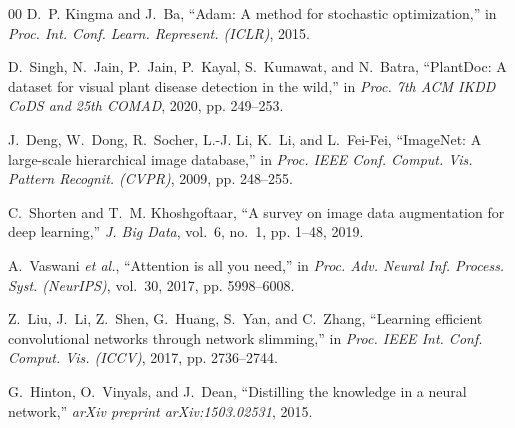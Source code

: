 \documentclass[journal]{IEEEtran}
\begin{document}
\begin{thebibliography}{00}
D.~P. Kingma and J.~Ba, ``Adam: A method for stochastic optimization,'' in \textit{Proc. Int. Conf. Learn. Represent. (ICLR)}, 2015.

D.~Singh, N.~Jain, P.~Jain, P.~Kayal, S.~Kumawat, and N.~Batra, ``PlantDoc: A dataset for visual plant disease detection in the wild,'' in \textit{Proc. 7th ACM IKDD CoDS and 25th COMAD}, 2020, pp. 249--253.

J.~Deng, W.~Dong, R.~Socher, L.-J. Li, K.~Li, and L.~Fei-Fei, ``ImageNet: A large-scale hierarchical image database,'' in \textit{Proc. IEEE Conf. Comput. Vis. Pattern Recognit. (CVPR)}, 2009, pp. 248--255.

C.~Shorten and T.~M. Khoshgoftaar, ``A survey on image data augmentation for deep learning,'' \textit{J. Big Data}, vol.~6, no.~1, pp. 1--48, 2019.

A.~Vaswani \textit{et al.}, ``Attention is all you need,'' in \textit{Proc. Adv. Neural Inf. Process. Syst. (NeurIPS)}, vol.~30, 2017, pp. 5998--6008.

Z.~Liu, J.~Li, Z.~Shen, G.~Huang, S.~Yan, and C.~Zhang, ``Learning efficient convolutional networks through network slimming,'' in \textit{Proc. IEEE Int. Conf. Comput. Vis. (ICCV)}, 2017, pp. 2736--2744.

G.~Hinton, O.~Vinyals, and J.~Dean, ``Distilling the knowledge in a neural network,'' \textit{arXiv preprint arXiv:1503.02531}, 2015.

\end{thebibliography}
\end{document}
